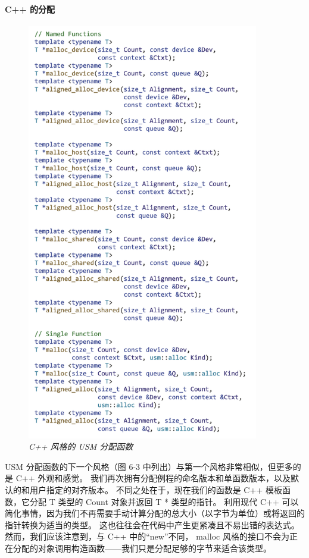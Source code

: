 \paragraph{C++ 的分配}

\begin{figure}[H]
	\centering
	\includegraphics[width=0.9\textwidth]{figs/F6.3.png}
	\caption{\textit{C++ 风格的 USM 分配函数}}
\end{figure}

USM 分配函数的下一个风格（图 6-3 中列出）与第一个风格非常相似，但更多的是 C++ 外观和感觉。 
我们再次拥有分配例程的命名版本和单函数版本，以及默认的和用户指定的对齐版本。 
不同之处在于，现在我们的函数是 C++ 模板函数，它分配 T 类型的 Count 对象并返回 T * 类型的指针。 
利用现代 C++ 可以简化事情，因为我们不再需要手动计算分配的总大小（以字节为单位）或将返回的指针转换为适当的类型。 
这也往往会在代码中产生更紧凑且不易出错的表达式。 
然而，我们应该注意到，与 C++ 中的“new”不同，
malloc 风格的接口不会为正在分配的对象调用构造函数——我们只是分配足够的字节来适合该类型。

